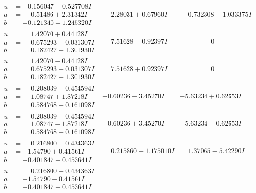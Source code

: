 \documentclass[1p]{elsarticle_modified}
\theoremstyle{definition}
\begin{document}
$$\begin{array}{c|c|c}
\begin{aligned}
u &= -0.156047 - 0.527708 I \\
a &= \phantom{-}0.51486 + 2.31342 I \\
b &= -0.121340 + 1.245320 I\end{aligned}
 & \phantom{-}2.28031 + 0.67960 I & \phantom{-}0.732308 - 1.033375 I \\ \hline\begin{aligned}
u &= \phantom{-}1.42070 + 0.44128 I \\
a &= \phantom{-}0.675293 - 0.031307 I \\
b &= \phantom{-}0.182427 - 1.301930 I\end{aligned}
 & \phantom{-}7.51628 - 0.92397 I & \phantom{-0.000000 } 0 \\ \hline\begin{aligned}
u &= \phantom{-}1.42070 - 0.44128 I \\
a &= \phantom{-}0.675293 + 0.031307 I \\
b &= \phantom{-}0.182427 + 1.301930 I\end{aligned}
 & \phantom{-}7.51628 + 0.92397 I & \phantom{-0.000000 } 0 \\ \hline\begin{aligned}
u &= \phantom{-}0.208039 + 0.454594 I \\
a &= \phantom{-}1.08747 + 1.87218 I \\
b &= \phantom{-}0.584768 - 0.161098 I\end{aligned}
 & -0.60236 - 3.45270 I & -5.63234 + 0.62653 I \\ \hline\begin{aligned}
u &= \phantom{-}0.208039 - 0.454594 I \\
a &= \phantom{-}1.08747 - 1.87218 I \\
b &= \phantom{-}0.584768 + 0.161098 I\end{aligned}
 & -0.60236 + 3.45270 I & -5.63234 - 0.62653 I \\ \hline\begin{aligned}
u &= \phantom{-}0.216800 + 0.434363 I \\
a &= -1.54790 + 0.41561 I \\
b &= -0.401847 + 0.453641 I\end{aligned}
 & \phantom{-}0.215860 + 1.175010 I & \phantom{-}1.37065 - 5.42290 I \\ \hline\begin{aligned}
u &= \phantom{-}0.216800 - 0.434363 I \\
a &= -1.54790 - 0.41561 I \\
b &= -0.401847 - 0.453641 I\end{aligned}

\end{array}$$
\end{document}
